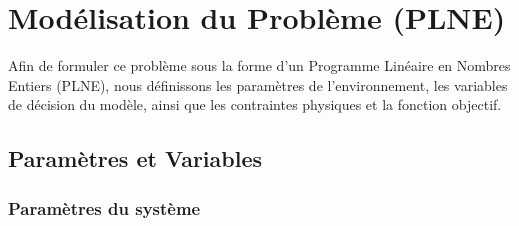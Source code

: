 \documentclass[8pt]{article}
\begin{document}

\section{Modélisation du Problème (PLNE)}

Afin de formuler ce problème sous la forme d'un Programme Linéaire en Nombres Entiers (PLNE), nous définissons les paramètres de l'environnement, les variables de décision du modèle, ainsi que les contraintes physiques et la fonction objectif.

\subsection{Paramètres et Variables}

\subsubsection{Paramètres du système}
\end{document}
